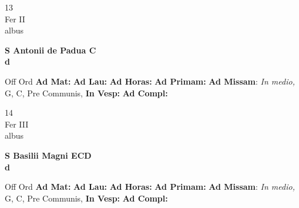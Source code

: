 \documentclass[10pt, openany]{book}
\begin{document}
    \begin{center}
        \begin{minipage}{3.5in}
            \vspace{2em}
            \begin{minipage}{0.5in}
                {\Huge 13} \\
                {\normalsize Fer II} \\
                {\normalsize albus}
            \end{minipage}
            \begin{minipage}{3.0in}
                \textbf{ \large S Antonii de Padua C \\
                \textnormal{\normalsize d}} \\ 
            \end{minipage}
            \begin{justify}Off Ord
                \textbf{Ad Mat: }
                \textbf{Ad Lau: }
                \textbf{Ad Horas: }
                \textbf{Ad Primam: }\textbf{Ad Missam}: \textit{In medio,} G, C, Pre Communis,  
                \textbf{In Vesp: }
                \textbf{Ad Compl: }
            \end{justify}
        \end{minipage}
    \end{center}

    \begin{center}
        \begin{minipage}{3.5in}
            \vspace{2em}
            \begin{minipage}{0.5in}
                {\Huge 14} \\
                {\normalsize Fer III} \\
                {\normalsize albus}
            \end{minipage}
            \begin{minipage}{3.0in}
                \textbf{ \large S Basilii Magni ECD \\
                \textnormal{\normalsize d}} \\ 
            \end{minipage}
            \begin{justify}Off Ord
                \textbf{Ad Mat: }
                \textbf{Ad Lau: }
                \textbf{Ad Horas: }
                \textbf{Ad Primam: }\textbf{Ad Missam}: \textit{In medio,} G, C, Pre Communis,  
                \textbf{In Vesp: }
                \textbf{Ad Compl: }
            \end{justify}
        \end{minipage}
    \end{center}
\end{document}
